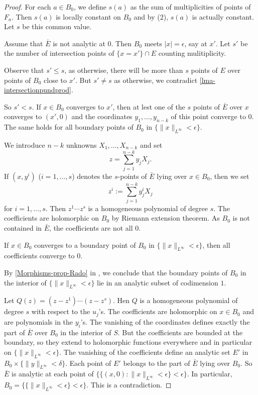 \begin{proof}
    For each $a\in B_0$, we define $s(a)$ as the sum of multiplicities of points of $F_a$.  Then $s(a)$ is locally constant on $B_0$ and by (2), $s(a)$ is actually constant. Let $s$ be this common value.

    Assume that $\bar{E}$ is not analytic at $0$.  Then $B_0$ meets $|x|=\epsilon$, say at $x'$. Let $s'$ be the number of intersection points of $\{x=x'\}\cap E$ counting mulitiplicity. 

    Observe that $s'\leq s$, as otherwise, there will be more than $s$ points of $E$ over points of $B_0$ close to $x'$. But $s'\neq s$ as otherwise, we contradict \cref{lma-intersectionpundprod}.

    So $s'<s$. If $x\in B_0$ converges to $x'$, then at lest one of the $s$ points of $\bar{E}$ over $x$ converges to $(x',0)$ and the coordinates $y_1,\ldots,y_{n-k}$ of this point converge to $0$. The same holds for all boundary points of $B_0$ in $\{\|x\|_{L^{\infty}}<\epsilon\}$.

    We introduce $n-k$ unknowns $X_1,\ldots,X_{n-k}$ and set
    \[
        z=\sum_{j=1}^{n-k}y_j X_j.  
    \]
    If $(x,y^i)$ ($i=1,\ldots,s$) denotes the $s$-points of $\bar{E}$ lying over $x\in B_0$, then we set
    \[
        z^i:=  \sum_{j=1}^{n-k}y^i_j X_j
    \]
    for $i=1,\ldots,s$. Then $z^1\cdots z^s$ is a homogeneous polynomial of degree $s$. The coefficients are holomorphic on $B_0$ by Riemann extension theorem. As $B_0$ is not contained in $\bar{E}$, the coefficients are not all $0$.

    If $x\in B_0$ converges to a boundary point of $B_0$ in $\{\|x\|_{L^{\infty}}<\epsilon\}$, then all coefficients converge to $0$. 

    By \cref{Morphisms-prop-Rado} in  , we conclude that the boundary points of $B_0$ in the interior of $\{\|x\|_{L^{\infty}}<\epsilon\}$ lie in an analytic subset of codimension $1$. 

    Let $Q(z)=(z-z^1)\cdots (z-z^s)$. Hen $Q$ is a homogeneous polynomial of degree $s$ with respect to the $u_j$'s. The coefficients are holomorphic on $x\in B_0$ and are polynomials in the $y_i$'s. The vanishing of the coordinates defines exactly the part of $\bar{E}$ over $B_0$ in the interior of $S$. But the coefficients are bounded at the boundary, so they extend to holomorphic functions everywhere and in particular on $\{\|x\|_{L^{\infty}}<\epsilon\}$. The vanishing of the coefficients define an analytic set $E'$ in $B_0\times \{\|y\|_{L^{\infty}}<\delta\}$. Each point of $E'$ belongs to the part of $\bar{E}$ lying over $B_0$. So $\bar{E}$ is analytic at each point of $\{\{(x,0):\|x\|_{L^{\infty}}<\epsilon\}<\epsilon\}$. In particular, $B_0=\{\{\|x\|_{L^{\infty}}<\epsilon\}<\epsilon\}$. This is a contradiction.   
\end{proof}

